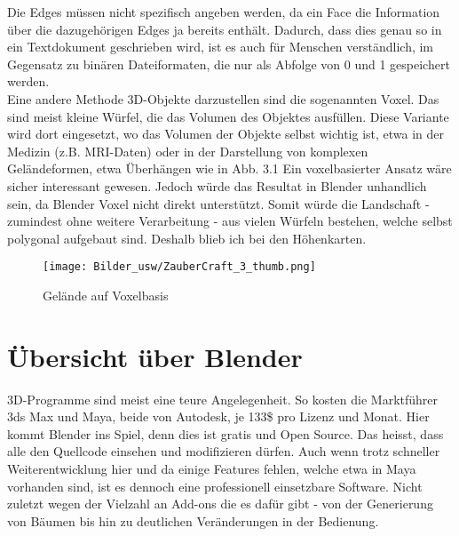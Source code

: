 \documentclass[12pt,twoside]{book}
\begin{document}
Die Edges m\"ussen nicht spezifisch angeben werden, da ein Face die Information \"uber die dazugeh\"origen Edges ja bereits enth\"alt.
Dadurch, dass dies genau so in ein Textdokument geschrieben wird, ist es auch f\"ur Menschen verst\"andlich, im Gegensatz zu bin\"aren Dateiformaten, die nur als Abfolge von 0 und 1 gespeichert werden.
\\
Eine andere Methode 3D-Objekte darzustellen sind die sogenannten Voxel. Das sind meist kleine W\"urfel, die das Volumen des Objektes ausf\"ullen. Diese Variante wird dort eingesetzt, wo das Volumen der Objekte selbst wichtig ist, etwa in der Medizin (z.B. MRI-Daten) oder in der Darstellung von komplexen Gel\"andeformen, etwa \"Uberh\"angen wie in Abb. 3.1
Ein voxelbasierter Ansatz w\"are sicher interessant gewesen. Jedoch w\"urde das Resultat in Blender unhandlich sein, da Blender Voxel nicht direkt unterst\"utzt. Somit w\"urde die Landschaft - zumindest ohne weitere Verarbeitung - aus vielen W\"urfeln bestehen, welche selbst polygonal aufgebaut sind. Deshalb blieb ich bei den H\"ohenkarten.

\begin{figure}[H]
\centering
\texttt{[image: Bilder\_usw/ZauberCraft\_3\_thumb.png]}
\caption{Gel\"ande auf Voxelbasis \cite{voxel} }
\label{fig:voxelPic}
\centering
\end{figure}


\chapter{\"Ubersicht \"uber Blender }
3D-Programme sind meist eine teure Angelegenheit. So kosten die Marktf\"uhrer 3ds Max und Maya, beide von Autodesk, je 133\$ pro Lizenz und Monat.
Hier kommt Blender ins Spiel, denn dies ist gratis und Open Source. Das heisst, dass alle den Quellcode einsehen und modifizieren d\"urfen.
Auch wenn trotz schneller Weiterentwicklung hier und da einige Features fehlen, welche etwa in Maya vorhanden sind, ist es dennoch eine professionell einsetzbare Software. 
Nicht zuletzt wegen der Vielzahl an Add-ons die es daf\"ur gibt - von der Generierung von B\"aumen bis hin zu deutlichen Ver\"anderungen in der Bedienung.
\end{document}
